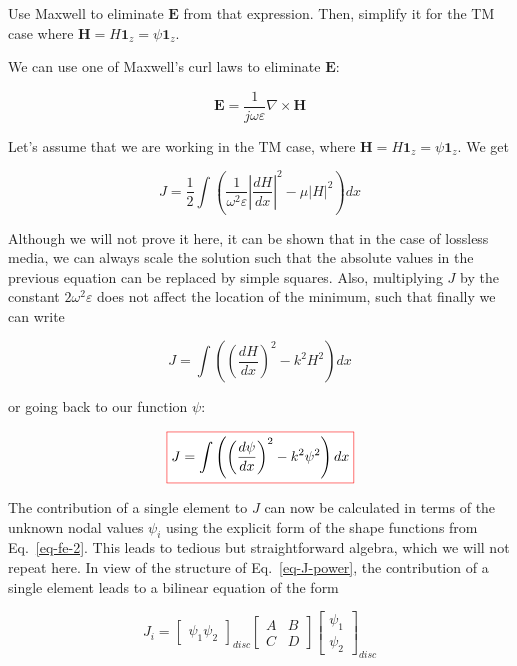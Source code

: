 \begin{cue}
Use Maxwell to eliminate ${\mathbf E}$ from that expression. Then, simplify it for the TM case where ${\mathbf H} = H {\mathbf 1}_z = \psi {\mathbf 1}_z $.  
\end{cue}

We can use one of Maxwell's curl laws to eliminate ${\mathbf E}$:

\begin{equation}
{\mathbf E} = \frac{1}{j \omega \varepsilon} \nabla \times {\mathbf H}
\end{equation}  

Let's assume that we are working in the TM case, where ${\mathbf H} = H {\mathbf 1}_z = \psi {\mathbf 1}_z $. We get

\begin{equation}
J = \frac{1}{2} \int \left( \frac{1}{\omega ^2 \varepsilon}\left|{\frac{d H}{d x}}\right|^2 - \mu |H|^2 \right) dx
\end{equation}

Although we will not prove it here, it can be shown that in the case of lossless media, we can always scale the solution such that the absolute values in the previous equation can be replaced by simple squares. Also, multiplying $J$ by the constant $2 \omega ^2 \varepsilon$ does not affect the location of the minimum, such that finally we can write

\begin{equation}
J = \int \left( \left(\frac{d H}{d x}\right)^2 - k^2 H^2 \right) dx
\end{equation}

or going back to our function $\psi$:

\begin{equation}
\fbox{$\displaystyle
J = \int \left( \left(\frac{d \psi}{d x}\right)^2 - k^2 \psi^2 \right) dx \label{eq-J-power}
$}
\end{equation} 

The contribution of a single element to $J$ can now be calculated in terms of the unknown nodal values $\psi_i$ using the explicit form of the shape functions from Eq.~\ref{eq-fe-2}. This leads to tedious but straightforward algebra, which we will not repeat here. In view of the structure of Eq.~\ref{eq-J-power}, the contribution of a single element leads to a bilinear equation of the form

\begin{equation}
J_i = \begin{bmatrix}
\psi_1 \psi_2 
\end{bmatrix}_{disc}
\begin{bmatrix}
A & B \\
C & D 
\end{bmatrix}
\begin{bmatrix}
\psi_1 \\ \psi_2
\end{bmatrix}_{disc}
\label{eq-J-power-i}
\end{equation} 

